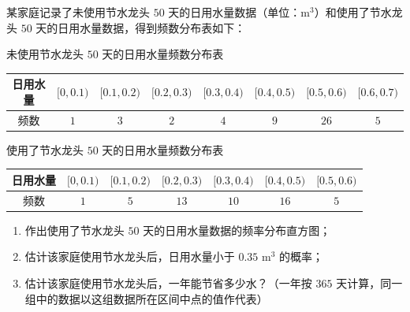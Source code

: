 \begin{problem}
某家庭记录了未使用节水龙头 \(50\) 天的日用水量数据（单位：\(\text{m}^3\)）和使用了节水龙头 \(50\) 天的日用水量数据，得到频数分布表如下：

未使用节水龙头 \(50\) 天的日用水量频数分布表

\begin{center}
\begin{tabular}{c|ccccccc}
\hline
日用水量 & \([0,0.1)\) & \([0.1,0.2)\) & \([0.2,0.3)\) & \([0.3,0.4)\) & \([0.4,0.5)\) & \([0.5,0.6)\) & \([0.6,0.7)\) \\
\hline
频数 & \(1\) & \(3\) & \(2\) & \(4\) & \(9\) & \(26\) & \(5\) \\
\hline
\end{tabular}
\end{center}

使用了节水龙头 \(50\) 天的日用水量频数分布表

\begin{center}
\begin{tabular}{c|cccccc}
\hline
日用水量 & \([0,0.1)\) & \([0.1,0.2)\) & \([0.2,0.3)\) & \([0.3,0.4)\) & \([0.4,0.5)\) & \([0.5,0.6)\) \\
\hline
频数 & \(1\) & \(5\) & \(13\) & \(10\) & \(16\) & \(5\) \\
\hline
\end{tabular}
\end{center}

\begin{enumerate}
\item 作出使用了节水龙头 \(50\) 天的日用水量数据的频率分布直方图；

\item 估计该家庭使用节水龙头后，日用水量小于 \(0.35\text{ m}^3\) 的概率；
\item 估计该家庭使用节水龙头后，一年能节省多少水？（一年按 \(365\) 天计算，同一组中的数据以这组数据所在区间中点的值作代表）
\end{enumerate}

\problemresetlayout
{}
\FloatBarrier
\end{problem}

